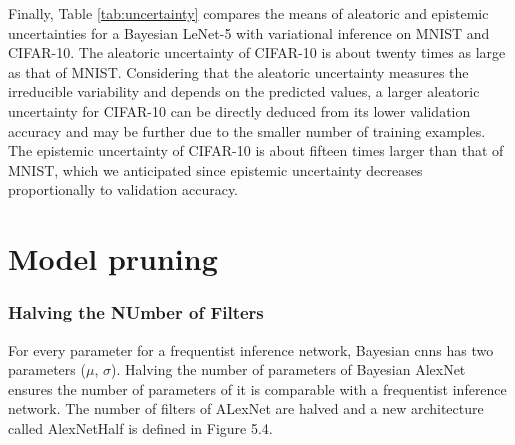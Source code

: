 \newline Finally, Table \ref{tab:uncertainty} compares the means of aleatoric and epistemic uncertainties for a Bayesian LeNet-5 with variational inference on MNIST and CIFAR-10. The aleatoric uncertainty of CIFAR-10 is about twenty times as large as that of MNIST. Considering that the aleatoric uncertainty measures the irreducible variability and depends on the predicted values, a larger aleatoric uncertainty for CIFAR-10 can be directly deduced from its lower validation accuracy and may be further due to the smaller number of training examples. The epistemic uncertainty of CIFAR-10 is about fifteen times larger than that of MNIST, which we anticipated since epistemic uncertainty decreases proportionally to validation accuracy. 
\begin{table}[t!]
\tiny
    \centering
    \renewcommand{\arraystretch}{1.5}
    \renewcommand{\arraystretch}{1.5}
    \caption{Aleatoric and epistemic uncertainty for Bayesian LeNet-5 calculated for MNIST and CIFAR-10, computed as proposed by Kwon et al. \cite{kwon2018uncertainty}.}
    \label{tab:uncertainty}
\end{table}

\section{Model pruning}

\subsubsection{Halving the NUmber of Filters}

For every parameter for a frequentist inference network, Bayesian \acp{cnn} has two parameters ($\mu$, $\sigma$). Halving the number of parameters of Bayesian AlexNet ensures the number of parameters of it is comparable with a frequentist inference network. The number of filters of ALexNet are halved and a new architecture called AlexNetHalf is defined in Figure 5.4. 

